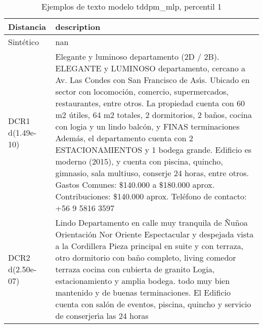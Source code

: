 \begin{table}[H]
\centering
\fontsize{10}{14}\selectfont
\caption{Ejemplos de texto modelo tddpm\_mlp, percentil 1}
\label{table-example-economicos-a-3-tddpm_mlp-1p-text}
\begin{tabular}{|l|m{35em}|}
\hline
\rowcolor[gray]{0.8}
Distancia & description \\
\hline Sintético & nan \\
\hline DCR1 d(1.49e-10) & Elegante y luminoso departamento (2D / 2B).  ELEGANTE y LUMINOSO departamento, cercano a Av. Las Condes con San Francisco de As{\'\i}s. Ubicado en sector con locomoci\'on, comercio, supermercados, restaurantes, entre otros.  La propiedad cuenta con 60 m2 \'utiles, 64 m2 totales, 2 dormitorios, 2 ba\~nos, cocina con logia y un lindo balc\'on, y FINAS terminaciones  Adem\'as, el departamento cuenta con 2 ESTACIONAMIENTOS y 1 bodega grande.  Edificio es moderno (2015), y cuenta con piscina, quincho, gimnasio, sala multiuso, conserje 24 horas, entre otros.  Gastos Comunes: \$140.000 a \$180.000 aprox. Contribuciones: \$140.000 aprox.  Tel\'efono de contacto: +56 9 5816 3597 \\
\hline DCR2 d(2.50e-07) & Lindo Departamento en calle muy tranquila de \~Nu\~noa Orientaci\'on Nor Oriente Espectacular y despejada vista a la Cordillera Pieza principal en suite y con terraza, otro dormitorio con ba\~no completo, living comedor terraza cocina con cubierta de granito Logia, estacionamiento y amplia bodega. todo muy bien mantenido y de buenas terminaciones. El Edificio cuenta con sal\'on de eventos, piscina, quincho y  servicio de conserjer{\'\i}a las 24 horas \\
\hline
\end{tabular}
\end{table}
